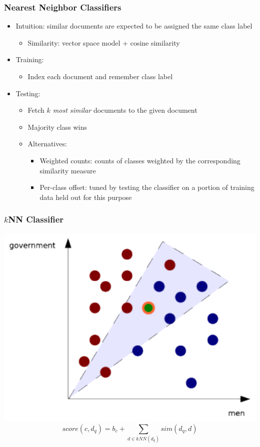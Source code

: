 \documentclass{beamer}
\begin{document}
\begin{frame}
  \frametitle{Nearest Neighbor Classifiers}

  \begin{itemize}
  \item Intuition: similar documents are expected to be assigned the same class label
    \begin{itemize}
    \item Similarity: vector space model + cosine similarity
    \end{itemize}
  \item Training:
    \begin{itemize}
    \item Index each document and remember class label
    \end{itemize}
  \item Testing:
    \begin{itemize}
    \item Fetch \emph{$k$ most similar} documents to the given document
    \item Majority class wins
    \item Alternatives:
      \begin{itemize}
      \item Weighted counts: counts of classes weighted by the corresponding
        similarity measure
      \item Per-class offset: tuned by testing the classifier on a portion of
        training data held out for this purpose
      \end{itemize}
    \end{itemize}
  \end{itemize}

\end{frame}


\begin{frame}
  \frametitle{$k$NN Classifier}

  \centering
  \includegraphics[width=.7\linewidth]{knn}
  \begin{displaymath}
    score(c,d_q) = b_c + \sum_{d \in kNN(d_q)}sim(d_q,d)
  \end{displaymath}

\end{frame}
\end{document}
